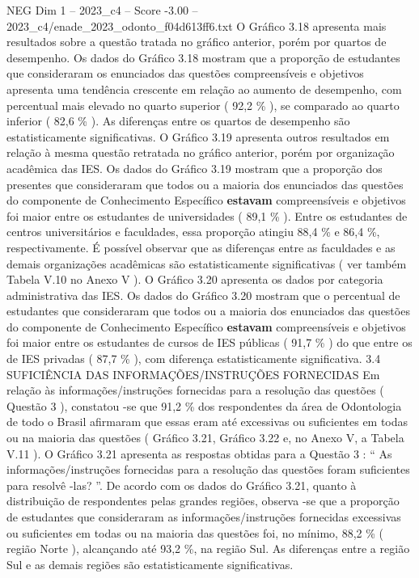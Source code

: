 \begin{textsample}{NEG Dim 1 – 2023\_c4 – Score -3.00 – 2023\_c4/enade\_2023\_odonto\_f04d613ff6.txt}
O Gráfico 3.18 apresenta mais resultados sobre a questão tratada no gráfico anterior, porém por quartos de desempenho.
Os dados do Gráfico 3.18 mostram que a proporção de estudantes que consideraram os enunciados das questões compreensíveis e objetivos apresenta uma tendência crescente em relação ao aumento de desempenho, com percentual mais elevado no quarto superior ( 92,2 \% ), se comparado ao quarto inferior ( 82,6 \% ).
As diferenças entre os quartos de desempenho são estatisticamente significativas.
O Gráfico 3.19 apresenta outros resultados em relação à mesma questão retratada no gráfico anterior, porém por organização acadêmica das IES.
Os dados do Gráfico 3.19 mostram que a proporção dos presentes que consideraram que todos ou a maioria dos enunciados das questões do componente de Conhecimento Específico \textbf{estavam} compreensíveis e objetivos foi maior entre os estudantes de universidades ( 89,1 \% ).
Entre os estudantes de centros universitários e faculdades, essa proporção atingiu 88,4 \% e 86,4 \%, respectivamente.
É possível observar que as diferenças entre as faculdades e as demais organizações acadêmicas são estatisticamente significativas ( ver também Tabela V.10 no Anexo V ).
O Gráfico 3.20 apresenta os dados por categoria administrativa das IES.
Os dados do Gráfico 3.20 mostram que o percentual de estudantes que consideraram que todos ou a maioria dos enunciados das questões do componente de Conhecimento Específico \textbf{estavam} compreensíveis e objetivos foi maior entre os estudantes de cursos de IES públicas ( 91,7 \% ) do que entre os de IES privadas ( 87,7 \% ), com diferença estatisticamente significativa. 3.4 SUFICIÊNCIA DAS INFORMAÇÕES/INSTRUÇÕES FORNECIDAS Em relação às informações/instruções fornecidas para a resolução das questões ( Questão 3 ), constatou -se que 91,2 \% dos respondentes da área de Odontologia de todo o Brasil afirmaram que essas eram até excessivas ou suficientes em todas ou na maioria das questões ( Gráfico 3.21, Gráfico 3.22 e, no Anexo V, a Tabela V.11 ).
O Gráfico 3.21 apresenta as respostas obtidas para a Questão 3 : “ As informações/instruções fornecidas para a resolução das questões foram suficientes para resolvê -las? ”.
De acordo com os dados do Gráfico 3.21, quanto à distribuição de respondentes pelas grandes regiões, observa -se que a proporção de estudantes que consideraram as informações/instruções fornecidas excessivas ou suficientes em todas ou na maioria das questões foi, no mínimo, 88,2 \% ( região Norte ), alcançando até 93,2 \%, na região Sul.
As diferenças entre a região Sul e as demais regiões são estatisticamente significativas.

\end{textsample}
